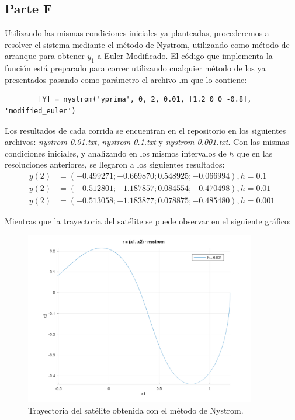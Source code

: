 \documentclass[titlepage,a4paper]{article}
\begin{document}
	\subsection{Parte F}\label{sec:parteF}
	Utilizando las mismas condiciones iniciales ya planteadas, procederemos a resolver el sistema mediante el método de Nystrom, utilizando como método de arranque para obtener $ y_1 $ a Euler Modificado. El código que implementa la función está preparado para correr utilizando cualquier método de los ya presentados pasando como parámetro el archivo .m que lo contiene:
	\begin{lstlisting}
		[Y] = nystrom('yprima', 0, 2, 0.01, [1.2 0 0 -0.8], 'modified_euler')
	\end{lstlisting}

	

	Los resultados de cada corrida se encuentran en el repositorio en los siguientes archivos: \emph{nystrom-0.01.txt}, \emph{nystrom-0.1.txt} y \emph{nystrom-0.001.txt}. Con las mismas condiciones iniciales, y analizando en los mismos intervalos de $ h $ que en las resoluciones anteriores, se llegaron a los siguientes resultados:
	\begin{align*}
		y(2) &= (-0.499271; -0.669870; 0.548925; -0.066994), h = 0.1\\
		y(2) &= (-0.512801; -1.187857; 0.084554; -0.470498), h = 0.01\\
		y(2) &= (-0.513058; -1.183877; 0.078875; -0.485480), h = 0.001
	\end{align*}

	Mientras que la trayectoria del satélite se puede observar en el siguiente gráfico:

	\begin{figure}[H]
		\centering
		\includegraphics[width=0.9\textwidth]{nystrom.png}
		\caption{\label{fig:parted}Trayectoria del satélite obtenida con el método de Nystrom.}
	\end{figure}
\end{document}
